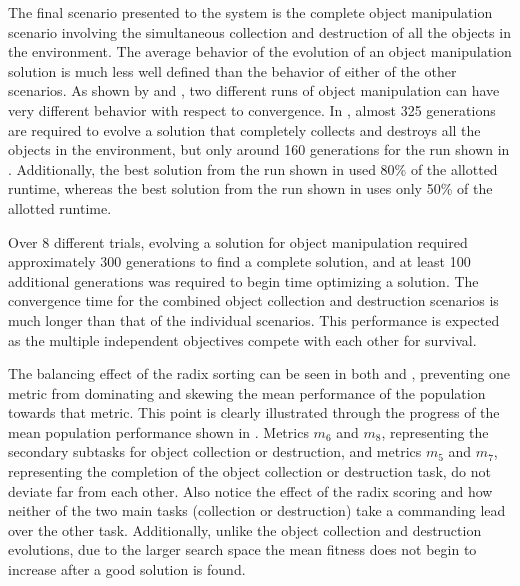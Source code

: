 The final scenario presented to the system is the complete object manipulation scenario involving the simultaneous collection and destruction of all the objects in the environment.  The average behavior of the evolution of an object manipulation solution is much less well defined than the behavior of either of the other scenarios.  As shown by  and , two different runs of object manipulation can have very different behavior with respect to convergence.  In , almost 325 generations are required to evolve a solution that completely collects and destroys all the objects in the environment, but only around 160 generations for the run shown in .  Additionally, the best solution from the run shown in  used 80\% of the allotted runtime, whereas the best solution from the run shown in  uses only 50\% of the allotted runtime. 

Over 8 different trials, evolving a solution for object manipulation required approximately 300 generations to find a complete solution, and at least 100 additional generations was required to begin time optimizing a solution.  The convergence time for the combined object collection and destruction scenarios is much longer than that of the individual scenarios.  This performance is expected as the multiple independent objectives compete with each other for survival.  

The balancing effect of the radix sorting can be seen in both  and , preventing one metric from dominating and skewing the mean performance of the population towards that metric.  This point is clearly illustrated through the progress of the mean population performance shown in .  Metrics $m_6$ and $m_8$, representing the secondary subtasks for object collection or destruction, and metrics $m_5$ and $m_7$, representing the completion of the object collection or destruction task, do not deviate far from each other.  Also notice the effect of the radix scoring and how neither of the two main tasks (collection or destruction) take a commanding lead over the other task.  Additionally, unlike the object collection and destruction evolutions, due to the larger search space the mean fitness does not begin to increase after a good solution is found.


